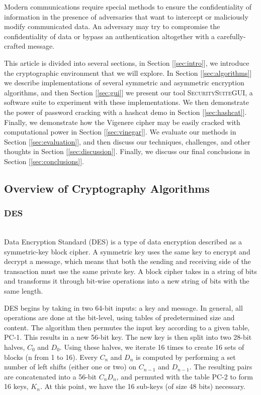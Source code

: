 \documentclass[acmlarge]{acmart}
\begin{document}
Modern communications require special methods to ensure the confidentiality of information in the presence of adversaries that want to intercept or maliciously modify communicated data. An adversary may try to compromise the confidentiality of data or bypass an authentication altogether with a carefully-crafted message.

This article is divided into several sections, in Section [\ref{sec:intro}], we introduce the cryptographic environment that we will explore. In Section [\ref{sec:algorithms}] we describe implementations of several symmetric and asymmetric encryption algorithms, and then Section [\ref{sec:gui}] we present our tool \textsc{SecuritySuiteGUI}, a software suite to experiment with these implementations. We then demonstrate the power of password cracking with a hashcat demo in Section [\ref{sec:hashcat}]. Finally, we demonstrate how the Vigenere cipher may be easily cracked with computational power in Section [\ref{sec:vinegar}]. We evaluate our methods in Section [\ref{sec:evaluation}], and then discuss our techniques, challenges, and other thoughts in Section [\ref{sec:discussion}]. Finally, we discuss our final conclusions in Section [\ref{sec:conclusions}].

\subsection{Overview of Cryptography Algorithms}
\subsubsection{DES}
\hspace*{\fill} \\ %
Data Encryption Standard (DES) is a type of data encryption described as a symmetric-key block cipher. A symmetric key uses the same key to encrypt and decrypt a message, which means that both the sending and receiving side of the transaction must use the same private key. A block cipher takes in a string of bits and transforms it through bit-wise operations into a new string of bits with the same length. 

DES begins by taking in two 64-bit inputs: a key and message. In general, all operations are done at the bit-level, using tables of predetermined size and content. The algorithm then permutes the input key according to a given table, PC-1. This results in a new 56-bit key. The new key is then split into two 28-bit halves, $C_{0}$ and $D_{0}$. Using these halves, we iterate 16 times to create 16 sets of blocks (n from 1 to 16). Every $C_{n}$ and  $D_{n}$ is computed by performing a set number of left shifts (either one or two) on $C_{n-1}$ and $D_{n-1}$.
 The resulting pairs are concatenated into a 56-bit $C_{n}D_{n}$, and permuted with the table PC-2 to form 16 keys, $K_{n}$. At this point, we have the 16 sub-keys (of size 48 bits) necessary. 
\end{document}
